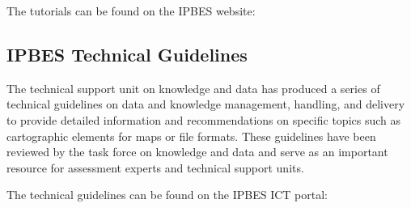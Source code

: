 \documentclass{article}
\begin{document}
The tutorials can be found on the IPBES website:

\subsection{IPBES Technical Guidelines}

The technical support unit on knowledge and data has produced a series of technical guidelines on data and knowledge management, handling, and delivery to provide detailed information and recommendations on specific topics such as cartographic elements for maps or file formats. These guidelines have been reviewed by the task force on knowledge and data and serve as an important resource for assessment experts and technical support units.

The technical guidelines can be found on the IPBES ICT portal:
\end{document}
